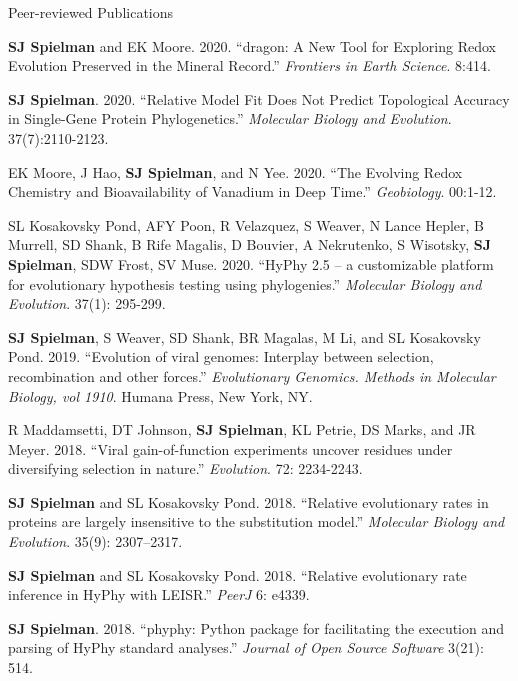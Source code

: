 \documentclass{resume} %
\begin{document}
\begin{rSection}{Peer-reviewed Publications}
\begin{etaremune}[leftmargin=1.5em]
\item \textbf{SJ Spielman} and EK Moore. 2020. ``dragon: A New Tool for Exploring Redox Evolution Preserved in the Mineral Record.'' \emph{Frontiers in Earth Science}. 8:414.

\item \textbf{SJ Spielman}. 2020. ``Relative Model Fit Does Not Predict Topological Accuracy in Single-Gene Protein Phylogenetics.'' \emph{Molecular Biology and Evolution}. 37(7):2110-2123.

\item EK Moore, J Hao, \textbf{SJ Spielman}, and N Yee. 2020. ``The Evolving Redox Chemistry and Bioavailability of Vanadium in Deep Time.'' \emph{Geobiology}. 00:1-12.

\item SL Kosakovsky Pond, AFY Poon, R Velazquez, S Weaver, N Lance Hepler, B Murrell, SD Shank, B Rife Magalis, D Bouvier, A Nekrutenko, S Wisotsky, \textbf{SJ Spielman}, SDW Frost, SV Muse. 2020. ``HyPhy 2.5 – a customizable platform for evolutionary hypothesis testing using phylogenies.'' \emph{Molecular Biology and Evolution}. 37(1): 295-299.

\item \textbf{SJ Spielman}, S Weaver, SD Shank, BR Magalas, M Li, and SL Kosakovsky Pond. 2019. ``Evolution of viral genomes: Interplay between selection, recombination and other forces.'' \emph{Evolutionary Genomics. Methods in Molecular Biology, vol 1910}. Humana Press, New York, NY.

\item R Maddamsetti, DT Johnson, \textbf{SJ Spielman}, KL Petrie, DS Marks, and JR Meyer. 2018. ``Viral gain-of-function experiments uncover residues under diversifying selection in nature.'' \emph{Evolution}. 72: 2234-2243.

\item \textbf{SJ Spielman} and SL Kosakovsky Pond. 2018. ``Relative evolutionary rates in proteins are largely insensitive to the substitution model.'' \emph{Molecular Biology and Evolution}. 35(9): 2307–2317.

\item \textbf{SJ Spielman} and SL Kosakovsky Pond. 2018. ``Relative evolutionary rate inference in HyPhy with LEISR.'' \emph{PeerJ} 6: e4339.

\item \textbf{SJ Spielman}. 2018. ``phyphy: Python package for facilitating the execution and parsing of HyPhy standard analyses.''  \emph{Journal of Open Source Software} 3(21): 514.


\end{etaremune}
\end{rSection}
\end{document}
